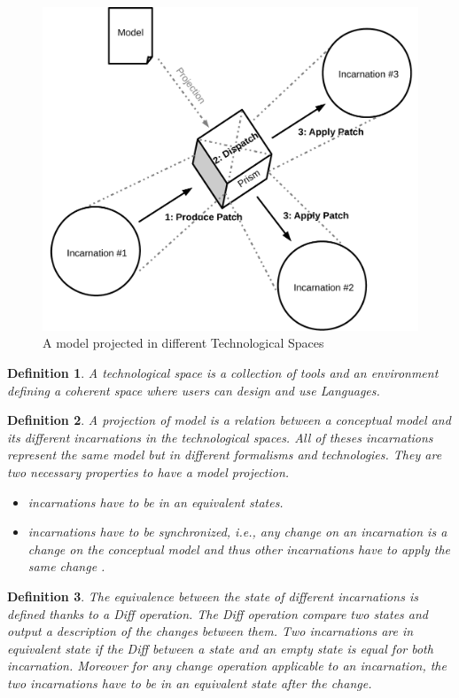 \documentclass[sigplan]{acmart}
\newtheorem{definition}{Definition}
\begin{document}
\begin{figure}
	\centering
	\includegraphics[width=.6\columnwidth]{figures/prism}
	\caption{A model projected in different Technological Spaces}
	\label{fig:prism}
\end{figure}

\begin{definition}
A technological space is a collection of tools and an environment defining a coherent space where users can design and use Languages.
\end{definition}

\begin{definition}
A projection of model is a relation between a conceptual model and its different incarnations in the technological spaces.
All of theses incarnations represent the same model but in different formalisms and technologies.
They are two necessary properties to have a model projection.
\begin{itemize}
	\item incarnations have to be in an equivalent  states.
	\item incarnations have to be synchronized, i.e., any change on an incarnation is a change on the conceptual model and thus other incarnations have to apply the same change .
\end{itemize}
\end{definition}

\begin{definition}
The equivalence between the state of different incarnations is defined thanks to a Diff operation.
The Diff operation compare two states and output a description of the changes between them.
Two incarnations are in equivalent state if the Diff between a state and an empty state is equal for both incarnation.
Moreover for any change operation applicable to an incarnation, the two incarnations have to be in an equivalent state after the change.
\end{definition}
\end{document}
